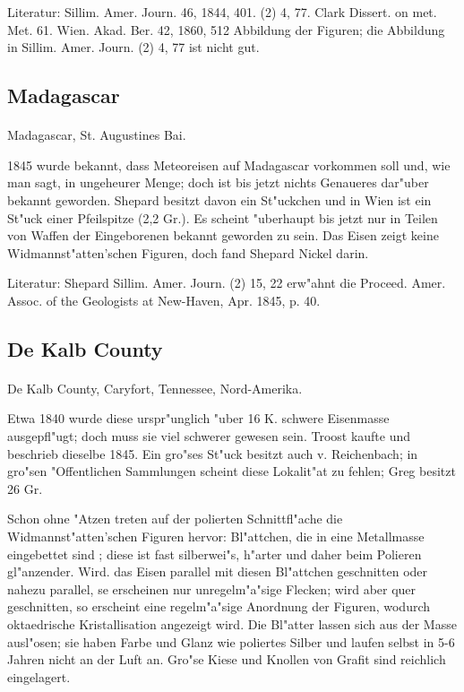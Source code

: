 \documentclass[a4paper, 11pt, oneside]{article}
\begin{document}
Literatur: Sillim. Amer. Journ. 46, 1844, 401. (2) 4, 77. Clark Dissert. on met. Met. 61. Wien. Akad. Ber. 42, 1860, 512 Abbildung der Figuren; die Abbildung in Sillim. Amer. Journ. (2) 4, 77 ist nicht gut.

\subsection{Madagascar}
\normalsize
\paragraph{}
Madagascar, St. Augustines Bai.

1845 wurde bekannt, dass Meteoreisen auf Madagascar vorkommen soll und, wie man sagt, in ungeheurer Menge; doch ist bis jetzt nichts Genaueres dar"uber bekannt geworden. Shepard besitzt davon ein St"uckchen und in Wien ist ein St"uck einer Pfeilspitze (2,2 Gr.). Es scheint "uberhaupt bis jetzt nur in Teilen von Waffen der Eingeborenen bekannt geworden zu sein. Das Eisen zeigt keine Widmannst"atten'schen Figuren, doch fand Shepard Nickel darin.

Literatur: Shepard Sillim. Amer. Journ. (2) 15, 22 erw"ahnt die Proceed. Amer. Assoc. of the Geologists at New-Haven, Apr. 1845, p. 40.

\subsection{De Kalb County}
\normalsize
\paragraph{}
De Kalb County, Caryfort, Tennessee, Nord-Amerika.

Etwa 1840 wurde diese urspr"unglich "uber 16 K. schwere Eisenmasse ausgepfl"ugt; doch muss sie viel schwerer gewesen sein. Troost kaufte und beschrieb dieselbe 1845. Ein gro"ses St"uck besitzt auch v. Reichenbach; in gro"sen "Offentlichen Sammlungen scheint diese Lokalit"at zu fehlen; Greg besitzt 26 Gr.

Schon ohne "Atzen treten auf der polierten Schnittfl"ache die Widmannst"atten'schen Figuren hervor: Bl"attchen, die in eine Metallmasse eingebettet sind ; diese ist fast silberwei"s, h"arter und daher beim Polieren gl"anzender. Wird. das Eisen parallel mit diesen Bl"attchen geschnitten oder nahezu parallel, se erscheinen nur unregelm"a"sige Flecken; wird aber quer geschnitten, so erscheint eine regelm"a"sige Anordnung der Figuren, wodurch oktaedrische Kristallisation angezeigt wird. Die Bl"atter lassen sich aus der Masse ausl"osen; sie haben Farbe und Glanz wie poliertes Silber und laufen selbst in 5-6 Jahren nicht an der Luft an. Gro"se Kiese und Knollen von Grafit sind reichlich eingelagert.
\end{document}
